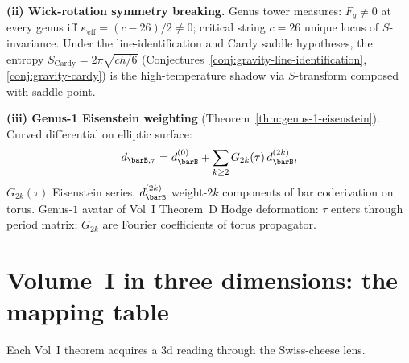\smallskip\textbf{(ii) Wick-rotation symmetry breaking.}
Genus tower measures: $F_g \neq 0$ at every genus iff
$\kappa_{\mathrm{eff}} = (c{-}26)/2 \neq 0$; critical string
$c = 26$ unique locus of $S$-invariance. Under the
line-identification and Cardy saddle hypotheses, the entropy
$S_{\mathrm{Cardy}} = 2\pi\sqrt{ch/6}$
(Conjectures~\ref{conj:gravity-line-identification},
\ref{conj:gravity-cardy}) is the high-temperature shadow via
$S$-transform composed with saddle-point.

\smallskip\textbf{(iii) Genus-1 Eisenstein weighting}
(Theorem~\ref{thm:genus-1-eisenstein}). Curved differential on
elliptic surface:
\[
d_{\barB,\tau} = d_{\barB}^{(0)} + \sum_{k \geq 2}
G_{2k}(\tau)\, d_{\barB}^{(2k)},
\]
$G_{2k}(\tau)$ Eisenstein series, $d_{\barB}^{(2k)}$
weight-$2k$ components of bar coderivation on torus. Genus-$1$
avatar of Vol~I Theorem~D Hodge deformation: $\tau$ enters
through period matrix; $G_{2k}$ are Fourier coefficients of
torus propagator.


\section*{Volume~I in three dimensions: the mapping table}

Each Vol~I theorem acquires a 3d reading through the
Swiss-cheese lens.

